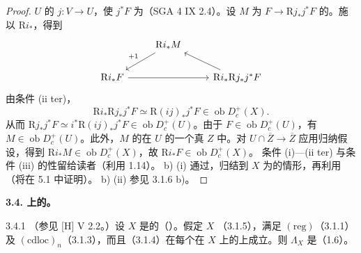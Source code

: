 \begin{proof}
$U$ 的 $j:V\to U$，使 $j^*F$ 为（SGA 4 IX 2.4）。设 $M$ 为 $F\to\mathrm Rj_*j^*F$ 的。施以 $\mathrm Ri_*$，得到
\[
\begin{tikzcd}
&\mathrm Ri_*M\arrow[dl,"{+1}"']\\
\mathrm Ri_*F\arrow[rr]&&\mathrm Ri_*\mathrm Rj_*j^*F\arrow[ul]
\end{tikzcd}
\]
由条件 (ii ter)，
\[
\mathrm Ri_*\mathrm Rj_*j^*F\simeq\mathrm R(ij)_*j^*F\in\operatorname{ob}D_c^+(X).
\]
从而 $\mathrm Rj_*j^*F\simeq i^*\mathrm R(ij)_*j^*F\in\operatorname{ob}D_c^+(U)$。由于 $F\in\operatorname{ob}D_c^+(U)$，有 $M\in\operatorname{ob}D_c^+(U)$。此外，$M$ 的在 $U$ 的一个真 $Z$ 中。对 $U\cap\overline Z\to\overline Z$ 应用归纳假设，得到 $\mathrm Ri_*M\in\operatorname{ob}D_c^+(X)$，故 $\mathrm Ri_*F\in\operatorname{ob}D_c^+(X)$。
条件 (i)—(ii ter) 与条件 (iii) 的性留给读者（利用 1.14）。
b) (i) 通过，归结到 $X$ 为的情形，再利用（将在 5.1 中证明）。
b) (ii) 参见 3.1.6 b)。
\end{proof}
\textbf{3.4. 上的。}
\begin{SGAresult}{}{3.4.1}
（参见 [H] V 2.2。）设 $X$ 是的（）。假定 $X$ （3.1.5），满足 $(\mathrm{reg})$（3.1.1）及 $(\mathrm{cdloc})_n$（3.1.3），而且（3.1.4）在每个在 $X$ 上的上成立。则 $\Lambda_X$ 是（1.6）。
\end{SGAresult}
